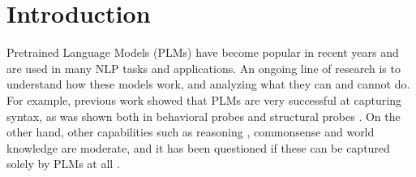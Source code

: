 \section{Introduction}
\label{sec:intro}

Pretrained Language Models (PLMs) have become popular in recent years and are used in many NLP tasks and applications.
An ongoing line of research is to understand how these models work, and analyzing what they can and cannot do.
For example, previous work showed that PLMs are very successful at capturing syntax, as was shown both in behavioral probes \cite{yoav-syntax} and structural probes \cite{structural-probe}.
On the other hand, other capabilities such as reasoning \cite{talmor2019olmpics}, commonsense \cite{Bosselut2019COMETCT,zhou2020evaluating} and world knowledge \cite{lama,jiang2020can} are moderate, and it has been questioned if these can be captured solely by PLMs at all \cite{Bender2020ClimbingTN}.



